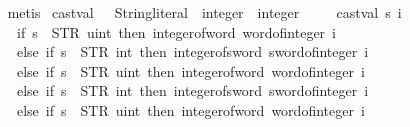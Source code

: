 \begin{isabellebody}
\ \ \isamarkupfalse%
\ metis%
\endisatagproof
{\isafoldproof}%
%
\isadelimproof
\isanewline
%
\endisadelimproof
\isanewline
{}\isamarkupfalse%
\ cast{\isacharunderscore}{\kern0pt}val\ {\isacharcolon}{\kern0pt}{\isacharcolon}{\kern0pt}\ \ {\isachardoublequoteopen}String{\isachardot}{\kern0pt}literal\ {\isasymRightarrow}\ integer\ {\isasymRightarrow}\ integer{\isachardoublequoteclose}\isanewline
\ \ \isanewline
\ \ {\isachardoublequoteopen}cast{\isacharunderscore}{\kern0pt}val\ s\ i\ {\isasymequiv}\isanewline
\ \ \ \ \ if\ s\ {\isacharequal}{\kern0pt}\ STR\ {\isacharprime}{\kern0pt}{\isacharprime}{\kern0pt}uint{}{\isacharprime}{\kern0pt}{\isacharprime}{\kern0pt}\ then\ integer{\isacharunderscore}{\kern0pt}of{\isacharunderscore}{\kern0pt}word{}\ {\isacharparenleft}{\kern0pt}word{}{\isacharunderscore}{\kern0pt}of{\isacharunderscore}{\kern0pt}integer\ i{\isacharparenright}{\kern0pt}\ \isanewline
\ \ \ \ \ else\ if\ s\ {\isacharequal}{\kern0pt}\ STR\ {\isacharprime}{\kern0pt}{\isacharprime}{\kern0pt}int{}{\isacharprime}{\kern0pt}{\isacharprime}{\kern0pt}\ then\ integer{\isacharunderscore}{\kern0pt}of{\isacharunderscore}{\kern0pt}sword{}\ {\isacharparenleft}{\kern0pt}sword{}{\isacharunderscore}{\kern0pt}of{\isacharunderscore}{\kern0pt}integer\ i{\isacharparenright}{\kern0pt}\isanewline
\ \ \ \ \ else\ if\ s\ {\isacharequal}{\kern0pt}\ STR\ {\isacharprime}{\kern0pt}{\isacharprime}{\kern0pt}uint{}{}{\isacharprime}{\kern0pt}{\isacharprime}{\kern0pt}\ then\ integer{\isacharunderscore}{\kern0pt}of{\isacharunderscore}{\kern0pt}word{}{}\ {\isacharparenleft}{\kern0pt}word{}{}{\isacharunderscore}{\kern0pt}of{\isacharunderscore}{\kern0pt}integer\ i{\isacharparenright}{\kern0pt}\isanewline
\ \ \ \ \ else\ if\ s\ {\isacharequal}{\kern0pt}\ STR\ {\isacharprime}{\kern0pt}{\isacharprime}{\kern0pt}int{}{}{\isacharprime}{\kern0pt}{\isacharprime}{\kern0pt}\ then\ integer{\isacharunderscore}{\kern0pt}of{\isacharunderscore}{\kern0pt}sword{}{}\ {\isacharparenleft}{\kern0pt}sword{}{}{\isacharunderscore}{\kern0pt}of{\isacharunderscore}{\kern0pt}integer\ i{\isacharparenright}{\kern0pt}\isanewline
\ \ \ \ \ else\ if\ s\ {\isacharequal}{\kern0pt}\ STR\ {\isacharprime}{\kern0pt}{\isacharprime}{\kern0pt}uint{}{}{\isacharprime}{\kern0pt}{\isacharprime}{\kern0pt}\ then\ integer{\isacharunderscore}{\kern0pt}of{\isacharunderscore}{\kern0pt}word{}{}\ {\isacharparenleft}{\kern0pt}word{}{}{\isacharunderscore}{\kern0pt}of{\isacharunderscore}{\kern0pt}integer\ i{\isacharparenright}{\kern0pt}\isanewline

\end{isabellebody}
